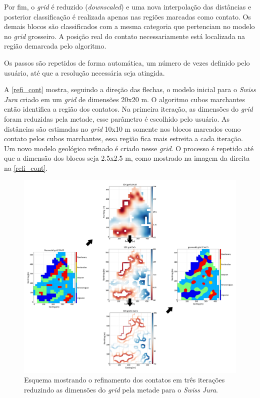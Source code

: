 Por fim, o \textit{grid} é reduzido (\textit{downscaled}) e uma nova interpolação das distâncias e posterior classificação é realizada apenas nas regiões marcadas como contato. Os demais blocos são classificados com a mesma categoria que pertenciam no modelo no \textit{grid} grosseiro. A posição real do contato necessariamente está localizada na região demarcada pelo algoritmo.

Os passos são repetidos de forma automática, um número de vezes definido pelo usuário, até que a resolução necessária seja atingida.

A \autoref{refi_cont} mostra, seguindo a direção das flechas, o modelo inicial para o \textit{Swiss Jura} criado em um \textit{grid} de dimensões 20x20 m. O algoritmo cubos marchantes então identifica a região dos contatos. Na primeira iteração, as dimensões do \textit{grid} foram reduzidas pela metade, esse parâmetro é escolhido pelo usuário. As distâncias são estimadas no \textit{grid} 10x10 m somente nos blocos marcados como contato pelos cubos marchantes, essa região fica mais estreita a cada iteração. Um novo modelo geológico refinado é criado nesse \textit{grid}. O processo é repetido até que a dimensão dos blocos seja 2.5x2.5 m, como mostrado na imagem da direita na \autoref{refi_cont}.

\begin{figure}[H]
\caption{\label{refi_cont} Esquema mostrando o refinamento dos contatos em três iterações reduzindo as dimensões do \textit{grid} pela metade para o \textit{Swiss Jura}.}
	\centering
		\includegraphics[width=\textwidth]{capitulo_2/imagens/bound_refinement.png}
\end{figure}

